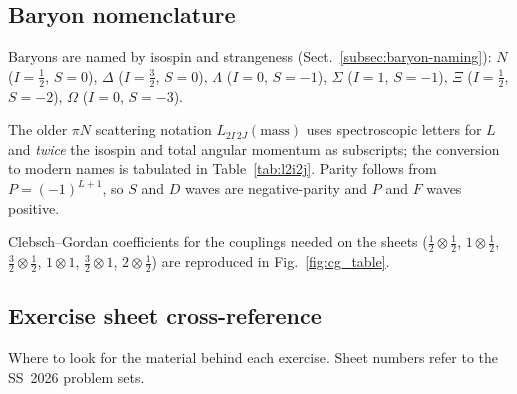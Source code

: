 \subsection{Baryon nomenclature}
\label{app:baryon-naming}

Baryons are named by isospin and strangeness (Sect.~\ref{subsec:baryon-naming}):
$N$ ($I=\tfrac12$, $S=0$), $\Delta$ ($I=\tfrac32$, $S=0$), $\Lambda$ ($I=0$, $S=-1$),
$\Sigma$ ($I=1$, $S=-1$), $\Xi$ ($I=\tfrac12$, $S=-2$), $\Omega$ ($I=0$, $S=-3$).

The older $\pi N$ scattering notation $L_{2I\,2J}(\text{mass})$ uses spectroscopic
letters for $L$ and \emph{twice} the isospin and total angular momentum as subscripts;
the conversion to modern names is tabulated in Table~\ref{tab:l2i2j}. Parity follows from
$P=(-1)^{L+1}$, so $S$ and $D$ waves are negative-parity and $P$ and $F$ waves positive.

Clebsch--Gordan coefficients for the couplings needed on the sheets
($\tfrac12\otimes\tfrac12$, $1\otimes\tfrac12$, $\tfrac32\otimes\tfrac12$,
$1\otimes 1$, $\tfrac32\otimes 1$, $2\otimes\tfrac12$) are reproduced in
Fig.~\ref{fig:cg_table}.

\subsection{Exercise sheet cross-reference}
\label{app:sheet-map}

Where to look for the material behind each exercise. Sheet numbers refer to the
SS~2026 problem sets.

